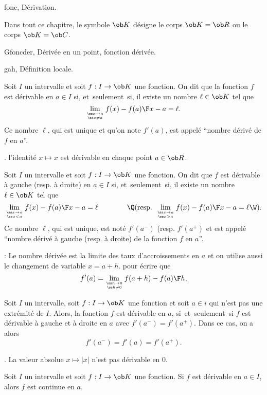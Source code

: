 
\pagetitretrue


\Chapter fonc, D\'erivation. 
\bigskip

\noindent
Dans tout ce chapitre, le symbole $\ob K$ d\'esigne le corps $\ob K=\ob R$ ou le corps $\ob K=\ob C$. 
\bigskip

\Section Gfoncder, D\'eriv\'ee en un point, fonction d\'eriv\'ee. 

\Subsection gah, D\'efinition locale. 

\Definition []  Soit $I$ un intervalle et soit $f:I\to\ob K$ une fonction. On dit que la fonction $f$ est d\'erivable en $a\in I$ si, et~seulement~si, il existe un nombre $\ell\in\ob K$ tel que 
$$
\lim_{\ss x\to a\atop\ss x\neq a}{f(x)-f(a)\F x-a}=\ell. 
$$
Ce nombre $\ell$, qui est unique et qu'on note $f'(a)$, est appel\'e ``nombre d\'eriv\'e de $f$ en $a$''. 
\bigskip

\Exemple. l'identit\'e $x\mapsto x$ est d\'erivable en chaque point $a\in\ob R$. 

\Definition []  Soit $I$ un intervalle et soit $f:I\to\ob K$ une fonction. On dit que $f$ est d\'erivable \`a gauche (resp. \`a droite) 
en $a\in I$ si, et~seulement~si, il existe un nombre $\ell\in\ob K$ tel que 
$$
\lim_{\ss x\to a\atop\ss x<a}{f(x)-f(a)\F x-a}=\ell\qquad\qquad\Q(\mbox{resp. }\lim_{\ss x\to a\atop\ss x>a}{f(x)-f(a)\F x-a}=\ell\W). 
$$
Ce nombre $\ell$, qui est unique, est not\'e $f'(a^-)$ (resp. $f'(a^+)$ et est appel\'e ``nombre d\'eriv\'e \`a gauche (resp. \`a droite) 
de la fonction $f$ en $a$''. 
\bigskip

\Remarque : Le nombre d\'eriv\'ee est la limite des taux d'accroissements en $a$ et on utilise aussi le changement de variable $x=a+h$. pour \'ecrire que 
$$
f'(a)=\lim_{\ss h\to 0\atop\ss h\neq 0}{f(a+h)-f(a)\F h}, 
$$


\Propriete []  Soit $I$ un intervalle, soit $f:I\to\ob K$ une fonction et soit $a\in i$ qui n'est pas une extr\'emit\'e de $I$. 
Alors, la fonction $f$ est d\'erivable en $a$, si~et~seulement~si $f$ est d\'erivable \`a gauche et \`a droite en $a$ avec $f'(a^-)=f'(a^+)$. Dans ce cas, on a alors
$$
f'(a^-)=f'(a)=f'(a^+).
$$
\bigskip

\Exemple. La valeur absolue $x\mapsto|x|$ n'est pas d\'erivable en $0$. 
\bigskip

\Propriete []  Soit $I$ un intervalle et soit $f:I\to\ob K$ une fonction. Si $f$ est d\'erivable en $a\in I$, alors $f$ est continue en $a$. 
\bigskip


